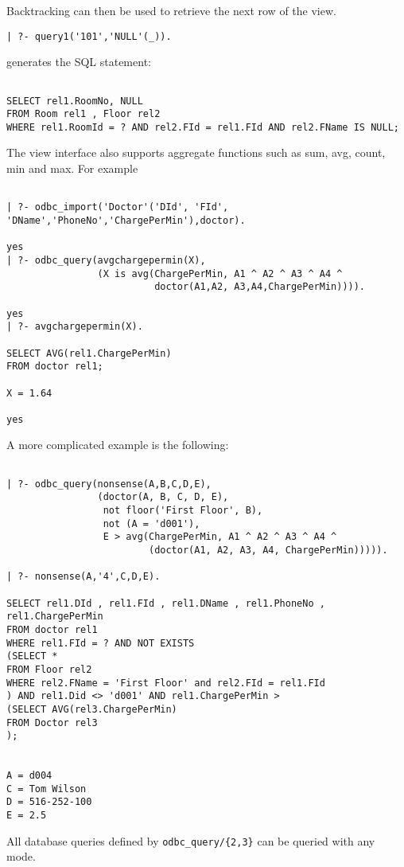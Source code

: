 Backtracking can then be used to retrieve the next row of the view.
\begin{verbatim}
| ?- query1('101','NULL'(_)).
\end{verbatim}

generates the SQL statement:
\begin{verbatim}

SELECT rel1.RoomNo, NULL
FROM Room rel1 , Floor rel2
WHERE rel1.RoomId = ? AND rel2.FId = rel1.FId AND rel2.FName IS NULL;
\end{verbatim}

The view interface also supports aggregate functions such as sum, avg,
count, min and max.  For example
\begin{verbatim}

| ?- odbc_import('Doctor'('DId', 'FId', 'DName','PhoneNo','ChargePerMin'),doctor).

yes
| ?- odbc_query(avgchargepermin(X),
                (X is avg(ChargePerMin, A1 ^ A2 ^ A3 ^ A4 ^ 
                          doctor(A1,A2, A3,A4,ChargePerMin)))).

yes
| ?- avgchargepermin(X).

SELECT AVG(rel1.ChargePerMin)
FROM doctor rel1;

X = 1.64

yes
\end{verbatim}

A more complicated example is the following:
\begin{verbatim}

| ?- odbc_query(nonsense(A,B,C,D,E),
                (doctor(A, B, C, D, E), 
                 not floor('First Floor', B), 
                 not (A = 'd001'), 
                 E > avg(ChargePerMin, A1 ^ A2 ^ A3 ^ A4 ^
                         (doctor(A1, A2, A3, A4, ChargePerMin))))).

| ?- nonsense(A,'4',C,D,E).

SELECT rel1.DId , rel1.FId , rel1.DName , rel1.PhoneNo , rel1.ChargePerMin
FROM doctor rel1
WHERE rel1.FId = ? AND NOT EXISTS
(SELECT *
FROM Floor rel2
WHERE rel2.FName = 'First Floor' and rel2.FId = rel1.FId
) AND rel1.Did <> 'd001' AND rel1.ChargePerMin >
(SELECT AVG(rel3.ChargePerMin)
FROM Doctor rel3
);


A = d004
C = Tom Wilson
D = 516-252-100
E = 2.5
\end{verbatim}

All database queries defined by {\tt odbc\_query/\{2,3\}} can be
queried with any mode.

